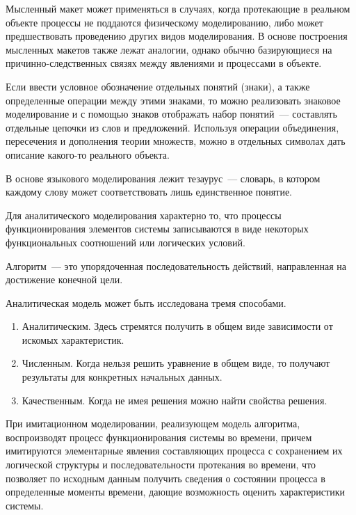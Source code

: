 Мысленный макет может применяться в случаях, когда протекающие в реальном объекте процессы не поддаются физическому моделированию, либо может предшествовать проведению других видов моделирования. В основе построения мысленных макетов также лежат аналогии, однако обычно базирующиеся на причинно-следственных связях между явлениями и процессами в объекте.

Если ввести условное обозначение отдельных понятий (знаки), а также определенные операции между этими знаками, то можно реализовать знаковое моделирование и с помощью знаков отображать набор понятий~--- составлять отдельные цепочки из слов и предложений. Используя операции объединения, пересечения и дополнения теории множеств, можно в отдельных символах дать описание какого-то реального объекта.

В основе языкового моделирования лежит тезаурус~--- словарь, в котором каждому слову может соответствовать лишь единственное понятие.

Для аналитического моделирования характерно то, что процессы функционирования элементов системы записываются в виде некоторых функциональных соотношений или логических условий.

\begin{dd}
    Алгоритм~--- это упорядоченная последовательность действий, направленная на достижение конечной цели.
\end{dd}

Аналитическая модель может быть исследована тремя способами.

\begin{enumerate}
    \item Аналитическим. Здесь стремятся получить в общем виде зависимости от искомых характеристик.
    \item Численным. Когда нельзя решить уравнение в общем виде, то получают результаты для конкретных начальных данных.
    \item Качественным. Когда не имея решения можно найти свойства решения.
\end{enumerate}

При имитационном моделировании, реализующем модель алгоритма, воспроизводят процесс функционирования системы во времени, причем имитируются элементарные явления составляющих процесса с сохранением их логической структуры и последовательности протекания во времени, что позволяет по исходным данным получить сведения о состоянии процесса в определенные моменты времени, дающие возможность оценить характеристики системы.

